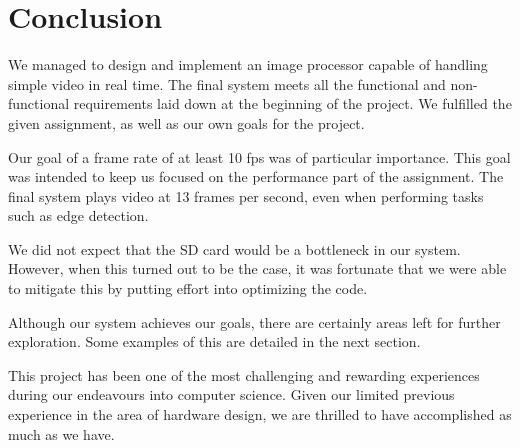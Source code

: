 \section{Conclusion}

We managed to design and implement an image processor capable of handling simple
video in real time. The final system meets all the functional and non-functional
requirements laid down at the beginning of the project. We fulfilled the given
assignment, as well as our own goals for the project.

Our goal of a frame rate of at least 10 fps was of particular importance. This
goal was intended to keep us focused on the performance part of the
assignment. The final system plays video at 13 frames per second, even when
performing tasks such as edge detection.

We did not expect that the SD card would be a bottleneck in our system. However,
when this turned out to be the case, it was fortunate that we were able to
mitigate this by putting effort into optimizing the code.

Although our system achieves our goals, there are certainly areas left for
further exploration. Some examples of this are detailed in the next section.

This project has been one of the most challenging and rewarding experiences
during our endeavours into computer science. Given our limited previous
experience in the area of hardware design, we are thrilled to have accomplished
as much as we have.
